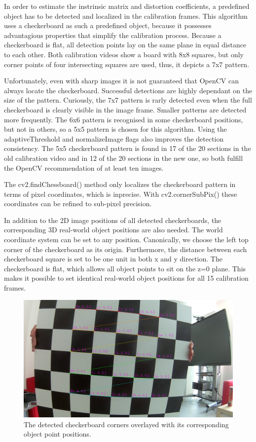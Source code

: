 \documentclass[bibliography=totoc]{scrartcl}
\begin{document}
In order to estimate the instrinsic matrix and distortion coefficients, a predefined object has to be detected and localized in the calibration frames.
This algorithm uses a checkerboard as such a predefined object, because it possesses advantagious properties that simplify the calibration process.
Because a checkerboard is flat, all detection points lay on the same plane in equal distance to each other.
Both calibration videos show a board with 8x8 squares, but only corner points of four intersecting squares are used, thus, it depicts a 7x7 pattern.

Unfortunately, even with sharp images it is not guaranteed that OpenCV can always locate the checkerboard.
Successful detections are highly dependant on the size of the pattern. 
Curiously, the 7x7 pattern is rarly detected even when the full checkerboard is clearly visible in the image frame.
Smaller patterns are detected more frequently.
The 6x6 pattern is recognised in some checkerboard positions, but not in others, so a 5x5 pattern is chosen for this algorithm.
Using the adaptiveThreshold and normalizeImage flags also improves the detection consistency.
The 5x5 checkerboard pattern is found in 17 of the 20 sections in the old calibration video and in 12 of the 20 sections in the new one, so both fulfill the OpenCV recommendation of at least ten images.

The cv2.findChessboard() method only localizes the checkerboard pattern in terms of pixel coordinates, which is inprecise.
With cv2.cornerSubPix() these coordinates can be refined to sub-pixel precision.

In addition to the 2D image positions of all detected checkerboards, the corresponding 3D real-world object positions are also needed.
The world coordinate system can be set to any position. 
Canonically, we choose the left top corner of the checkerboard as its origin.
Furthermore, the distance between each checkerboard square is set to be one unit in both x and y direction. 
The checkerboard is flat, which allows all object points to sit on the z=0 plane.
This makes it possible to set identical real-world object positions for all 15 calibration frames.\\

\begin{figure}[ht!]
	\centering
	\includegraphics[width=\linewidth]{imgs/labeled_checkerboard.png}
	\caption{The detected checkerboard corners overlayed with its corresponding object point positions.}
	\label{fig:labeled_checkerboard}
\end{figure}
\end{document}
